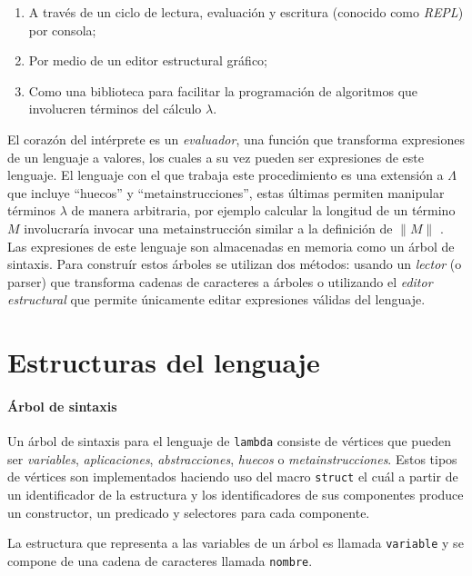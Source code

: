 \begin{enumerate}
\item A través de un ciclo de lectura, evaluación y escritura (conocido como \emph{REPL}) por consola;
\item Por medio de un editor estructural gráfico;
\item Como una biblioteca para facilitar la programación de algoritmos que involucren términos del cálculo \( λ \).
\end{enumerate}

El corazón del intérprete es un \emph{evaluador}, una función que transforma expresiones de un lenguaje a valores, los cuales a su vez pueden ser expresiones de este lenguaje. El lenguaje con el que trabaja este procedimiento es una extensión a \( Λ \) que incluye ``huecos'' y ``metainstrucciones'', estas últimas permiten manipular términos \( λ \) de manera arbitraria, por ejemplo calcular la longitud de un término \( M \) involucraría invocar una metainstrucción similar a la definición de \( \| M \| \) . Las expresiones de este lenguaje son almacenadas en memoria como un árbol de sintaxis. Para construír estos árboles se utilizan dos métodos: usando un \emph{lector} (o parser) que transforma cadenas de caracteres a árboles o utilizando el \emph{editor estructural} que permite únicamente editar expresiones válidas del lenguaje.

\nwenddocs{}\section*{Estructuras del lenguaje}

\nwenddocs{}\paragraph{Árbol de sintaxis}

Un árbol de sintaxis para el lenguaje de {\tt{}lambda} consiste de vértices que pueden ser \emph{variables}, \emph{aplicaciones}, \emph{abstracciones}, \emph{huecos} o \emph{metainstrucciones}. Estos tipos de vértices son implementados haciendo uso del macro {\tt{}struct} el cuál a partir de un identificador de la estructura y los identificadores de sus componentes produce un constructor, un predicado y selectores para cada componente.

La estructura que representa a las variables de un árbol es llamada {\tt{}\protect{}variable} y se compone de una cadena de caracteres llamada {\tt{}nombre}.

